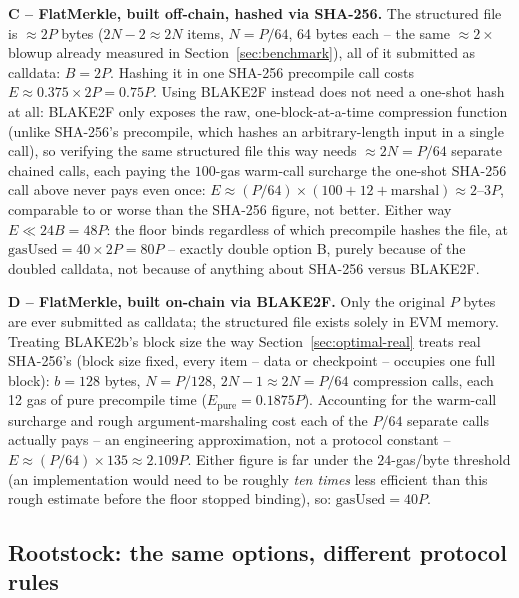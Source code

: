 \textbf{C -- FlatMerkle, built off-chain, hashed via SHA-256.} The
structured file is $\approx 2P$ bytes ($2N{-}2\approx 2N$ items, $N=P/64$,
64 bytes each -- the same $\approx\!2\times$ blowup already measured in
Section~\ref{sec:benchmark}), all of it submitted as calldata: $B=2P$.
Hashing it in one SHA-256 precompile call costs $E \approx 0.375\times 2P =
0.75P$. Using BLAKE2F instead does not need a one-shot hash at all:
BLAKE2F only exposes the raw, one-block-at-a-time compression function
(unlike SHA-256's precompile, which hashes an arbitrary-length input in a
single call), so verifying the same structured file this way needs
$\approx 2N = P/64$ separate chained calls, each paying the $100$-gas
warm-call surcharge the one-shot SHA-256 call above never pays even once:
$E \approx (P/64)\times(100+12+\text{marshal}) \approx 2\text{--}3P$,
comparable to or worse than the SHA-256 figure, not better. Either way
$E \ll 24B = 48P$: the floor binds regardless of which precompile hashes
the file, at $\mathrm{gasUsed} = 40\times 2P = 80P$ -- exactly double
option B, purely because of the doubled calldata, not because of anything
about SHA-256 versus BLAKE2F.

\textbf{D -- FlatMerkle, built on-chain via BLAKE2F.} Only the original $P$
bytes are ever submitted as calldata; the structured file exists solely in
EVM memory. Treating BLAKE2b's block size the way
Section~\ref{sec:optimal-real} treats real SHA-256's (block size fixed,
every item -- data or checkpoint -- occupies one full block): $b=128$
bytes, $N=P/128$, $2N{-}1\approx 2N = P/64$ compression calls, each 12 gas
of pure precompile time ($E_{\text{pure}} = 0.1875P$). Accounting for the
warm-call surcharge and rough argument-marshaling cost each of the $P/64$
separate calls actually pays -- an engineering approximation, not a
protocol constant -- $E \approx (P/64)\times 135 \approx 2.109P$. Either
figure is far under the $24$-gas/byte threshold (an implementation would
need to be roughly \emph{ten times} less efficient than this rough estimate
before the floor stopped binding), so: $\mathrm{gasUsed} = 40P$.

\subsection{Rootstock: the same options, different protocol rules}
\label{sec:rollup-rsk}

